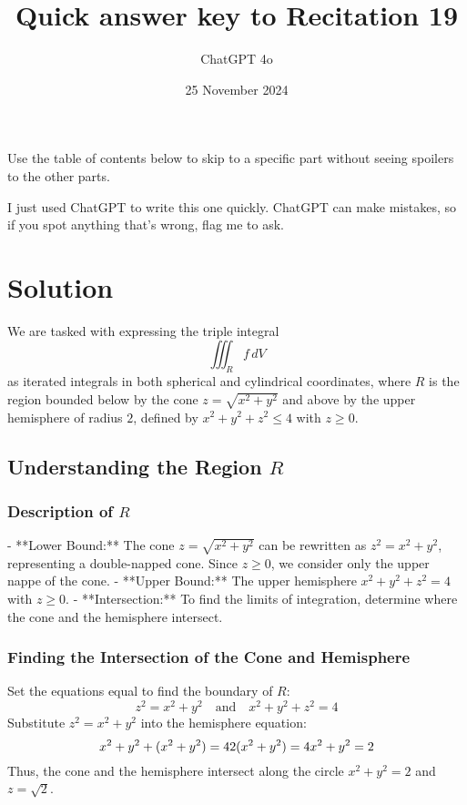 \documentclass[11pt]{article}
\begin{document}
\title{Quick answer key to Recitation 19}
\author{ChatGPT 4o}
\date{25 November 2024}
\maketitle

Use the table of contents below to skip to a specific part
without seeing spoilers to the other parts.

I just used ChatGPT to write this one quickly.
ChatGPT can make mistakes, so if you spot anything that's wrong, flag me to ask.

\tableofcontents



\newpage

\section{Solution}

We are tasked with expressing the triple integral
\[
\iiint_{R} f \, dV
\]
as iterated integrals in both spherical and cylindrical coordinates, where \( R \) is the region bounded below by the cone \( z = \sqrt{x^2 + y^2} \) and above by the upper hemisphere of radius \( 2 \), defined by \( x^2 + y^2 + z^2 \leq 4 \) with \( z \geq 0 \).

\newpage

\subsection{Understanding the Region \( R \)}

\subsubsection{Description of \( R \)}
- **Lower Bound:** The cone \( z = \sqrt{x^2 + y^2} \) can be rewritten as \( z^2 = x^2 + y^2 \), representing a double-napped cone. Since \( z \geq 0 \), we consider only the upper nappe of the cone.
- **Upper Bound:** The upper hemisphere \( x^2 + y^2 + z^2 = 4 \) with \( z \geq 0 \).
- **Intersection:** To find the limits of integration, determine where the cone and the hemisphere intersect.

\subsubsection{Finding the Intersection of the Cone and Hemisphere}

Set the equations equal to find the boundary of \( R \):
\[
z^2 = x^2 + y^2 \quad \text{and} \quad x^2 + y^2 + z^2 = 4
\]
Substitute \( z^2 = x^2 + y^2 \) into the hemisphere equation:
\[
x^2 + y^2 + (x^2 + y^2) = 4 \\
2(x^2 + y^2) = 4 \\
x^2 + y^2 = 2
\]
Thus, the cone and the hemisphere intersect along the circle \( x^2 + y^2 = 2 \) and \( z = \sqrt{2} \).
\end{document}
